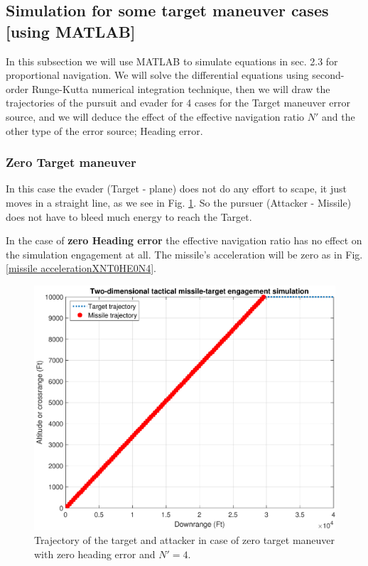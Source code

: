 \subsection{Simulation for some target maneuver cases [using MATLAB]}
In this subsection we will use MATLAB to simulate equations in sec. 2.3 for proportional navigation. We will solve the differential equations using second-order Runge-Kutta numerical integration technique, then we will draw the trajectories of the pursuit and evader for 4 cases for the Target maneuver error source, and we will deduce the effect of the effective navigation ratio $N'$ and the other type of the error source; Heading error. 
\subsubsection{Zero Target maneuver}
In this case the evader (Target - plane) does not do any effort to scape, it just moves in a straight line, as we see in Fig. \ref{trajectoryXNT0HE0N4}. So the pursuer (Attacker - Missile) does not have to bleed much energy to reach the Target.

In the case of \textbf{zero Heading error} the effective navigation ratio has no effect on the simulation engagement at all. The missile's acceleration will be zero as in Fig. \ref{missile accelerationXNT0HE0N4}.

\begin{figure}[H]
	\centering
	\includegraphics[scale = 0.7]{fig/trajectoryXNT0HE0N4.pdf}
	\caption{Trajectory of the target and attacker in case of zero target maneuver with zero heading error and $N'=4$.}
	\label{trajectoryXNT0HE0N4}
\end{figure}


